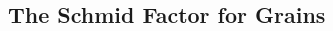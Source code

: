 \documentclass[compress]{beamer}
\begin{document}
\begin{frame}[fragile]
\begin{columns}
\begin{column}{4cm}
  \begin{overlayarea}{\textwidth}{8cm}

    \vspace{-0.2cm}

  \end{overlayarea}

\end{column}
\end{columns}

\end{frame}

\subsection*{The Schmid Factor for Grains}
\end{document}
